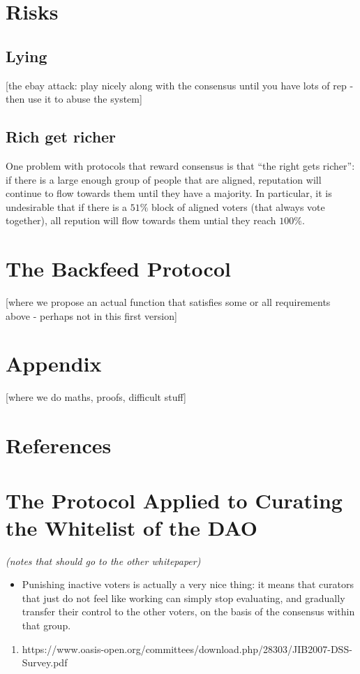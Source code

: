 \documentclass{article}
\begin{document}
\section{Risks}

\subsection{Lying}

[the ebay attack: play nicely along with the consensus until you have lots of rep - then use it to abuse the system]

\subsection{Rich get richer}

One problem with protocols that reward consensus is that ``the right gets richer'': if there is a large enough group of people that are aligned, reputation will continue to flow towards them until they have a majority. In particular, it is undesirable that if there is a $51\%$ block of aligned voters (that always vote together), all repution will flow towards them untial they reach $100\%$.

\section{The Backfeed Protocol}

[where we propose an actual function that satisfies some or all requirements above - perhaps not in this first version]

\section{Appendix}
[where we do  maths, proofs, difficult stuff]

\section{References}

\section{The Protocol Applied to Curating the Whitelist of the DAO}

{\em (notes that should go to the other whitepaper) }
\begin{itemize}
\item Punishing inactive voters is actually a very nice thing: it means that curators that just do not feel like working can simply stop evaluating, and gradually transfer their control to the other voters, on the basis of the consensus within that group.
\end{itemize}

\begin{enumerate}
\item https://www.oasis-open.org/committees/download.php/28303/JIB2007-DSS-Survey.pdf
\end{enumerate}
\end{document}
